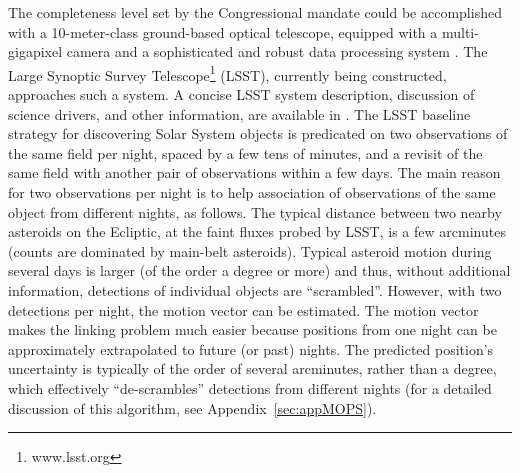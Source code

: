 The completeness level set by the Congressional mandate could be accomplished with a 10-meter-class
ground-based optical telescope, equipped with a multi-gigapixel camera and a sophisticated and robust data
processing system \citep[see NASA-commissioned reports by ][]{stokes03,shapiro10}. 
The Large Synoptic Survey Telescope\footnote{www.lsst.org} (LSST), currently being
constructed, approaches such a system. A concise LSST system description, discussion of science drivers, and other
information, are available in \cite{LSSToverview}. The LSST baseline strategy for discovering Solar System
objects is predicated on two observations of the same field per night, spaced by a few tens of minutes, and
a revisit of the same field with another pair of observations within a few days. The main reason for two
observations per night is to help association of observations of the same object from different nights,
as follows. The typical distance between two nearby asteroids on the Ecliptic, at the faint fluxes probed by
LSST, is a few arcminutes (counts are dominated by main-belt asteroids). Typical asteroid motion
during several days is larger (of the order a degree or more) and thus, without additional information,
detections of individual objects are ``scrambled''. However, with two detections per night, the motion
vector can be estimated. The motion vector makes the linking problem much easier because
positions from one night can be approximately extrapolated to future (or past) nights. The predicted
position's uncertainty is typically of the order of several arcminutes, rather than a degree, which effectively
``de-scrambles'' detections from different nights (for a detailed discussion of this algorithm, see
Appendix~\ref{sec:appMOPS}).

